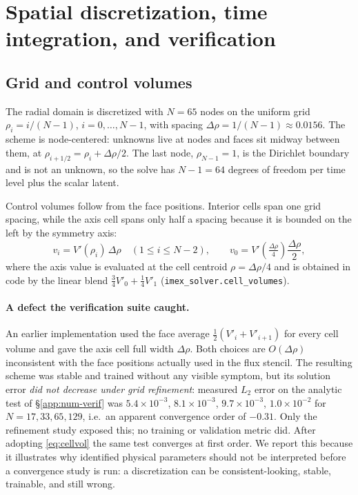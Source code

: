 
\section{Spatial discretization, time integration, and verification}
\label{app:numerics}

\subsection{Grid and control volumes}

The radial domain is discretized with $N = 65$ nodes on the uniform grid
$\rho_i = i/(N-1)$, $i = 0,\dots,N-1$, with spacing
$\Delta\rho = 1/(N-1) \approx 0.0156$. The scheme is node-centered:
unknowns live at nodes and faces sit midway between them, at
$\rho_{i+1/2} = \rho_i + \Delta\rho/2$. The last node, $\rho_{N-1} = 1$, is
the Dirichlet boundary and is not an unknown, so the solve has $N-1 = 64$
degrees of freedom per time level plus the scalar latent.

Control volumes follow from the face positions. Interior cells span one
grid spacing, while the axis cell spans only half a spacing because it is
bounded on the left by the symmetry axis:
\begin{equation}
v_i = V'(\rho_i)\,\Delta\rho \quad (1 \le i \le N-2),
\qquad
v_0 = V'\!\left(\tfrac{\Delta\rho}{4}\right)\frac{\Delta\rho}{2},
\label{eq:cellvol}
\end{equation}
where the axis value is evaluated at the cell centroid $\rho = \Delta\rho/4$
and is obtained in code by the linear blend
$\tfrac{3}{4}V'_0 + \tfrac{1}{4}V'_1$
(\texttt{imex\_solver.cell\_volumes}).

\paragraph{A defect the verification suite caught.} An earlier
implementation used the face average $\tfrac12(V'_i + V'_{i+1})$ for every
cell volume and gave the axis cell full width $\Delta\rho$. Both choices
are $O(\Delta\rho)$ inconsistent with the face positions actually used in
the flux stencil. The resulting scheme was stable and trained without any
visible symptom, but its solution error \emph{did not decrease under grid
refinement}: measured $L_2$ error on the analytic test of
\S\ref{app:num-verif} was $5.4\times10^{-3}$, $8.1\times10^{-3}$,
$9.7\times10^{-3}$, $1.0\times10^{-2}$ for $N = 17, 33, 65, 129$, i.e.\ an
apparent convergence order of $-0.31$. Only the refinement study exposed
this; no training or validation metric did. After adopting
\eqref{eq:cellvol} the same test converges at first order. We report this
because it illustrates why identified physical parameters should not be
interpreted before a convergence study is run: a discretization can be
consistent-looking, stable, trainable, and still wrong.

